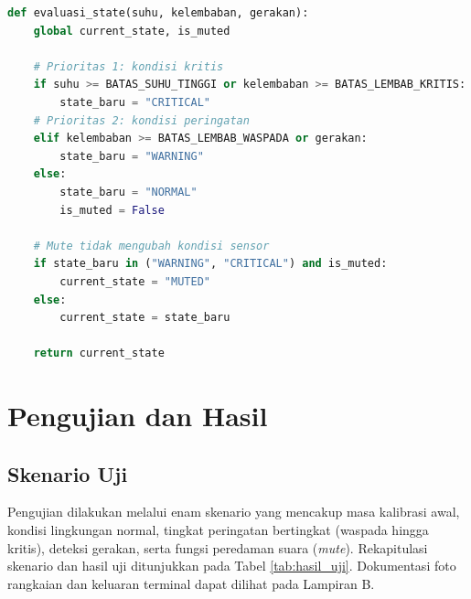 \documentclass[12pt, a4paper]{article}
\begin{document}
\begin{lstlisting}[language=Python, caption={Cuplikan Fungsi Evaluasi State dan Kontrol Output}]
def evaluasi_state(suhu, kelembaban, gerakan):
    global current_state, is_muted

    # Prioritas 1: kondisi kritis
    if suhu >= BATAS_SUHU_TINGGI or kelembaban >= BATAS_LEMBAB_KRITIS:
        state_baru = "CRITICAL"
    # Prioritas 2: kondisi peringatan
    elif kelembaban >= BATAS_LEMBAB_WASPADA or gerakan:
        state_baru = "WARNING"
    else:
        state_baru = "NORMAL"
        is_muted = False

    # Mute tidak mengubah kondisi sensor
    if state_baru in ("WARNING", "CRITICAL") and is_muted:
        current_state = "MUTED"
    else:
        current_state = state_baru

    return current_state
\end{lstlisting}

\section{Pengujian dan Hasil}
\subsection{Skenario Uji}
Pengujian dilakukan melalui enam skenario yang mencakup masa kalibrasi awal, kondisi lingkungan normal, tingkat peringatan 
bertingkat (waspada hingga kritis), deteksi gerakan, serta fungsi peredaman suara (\textit{mute}). Rekapitulasi skenario dan 
hasil uji ditunjukkan pada Tabel \ref{tab:hasil_uji}. Dokumentasi foto rangkaian dan keluaran terminal dapat dilihat pada Lampiran B.
\end{document}
